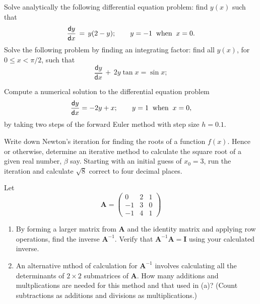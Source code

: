 \documentclass[12pt]{article}
\def\bA{\mathbf{A}}
\def\bI{\mathbf{I}}
\newcommand{\dif}{\mathsf{d}}
\begin{document}
\question
Solve analytically the following differential equation problem: find $y(x)$ such that
$$ \frac{\dif y}{\dif x}\,=\,  y (2-y)   ; \qquad y=-1\>\hbox{ when }\> x=0. $$
\question
Solve the following problem by finding an  integrating factor:  find all $y(x)$, for $0\le x < \pi/2$, such that
$$  \frac{\dif y}{\dif x}\,+\, 2y\tan x = \sin{x}   ;  $$
\noindent

\newpage
\question
Compute a numerical solution to the differential equation problem 
$$ \frac{\dif y}{\dif x} =  -2 y + x    ; \qquad y=1\>\hbox{ when }\> x=0, $$
by taking two steps of the forward Euler method with 
step size $h=0.1$.

\question
Write down  Newton's iteration   for finding the roots of
a function $f(x)$. Hence or otherwise, 
determine an iterative method to calculate the square root of a given real 
number, $\beta$ say. Starting with an initial guess of $x_0 =3$, run the
iteration and   calculate $\sqrt{8}$ correct to  four decimal places.



\question

Let
$$ \bA = \left( \begin{array}{rrr} 0 & 2& 1 \\ -1 &  3 & 0 \\ -1 & 4 & 1  \end{array} \right)$$  



\begin{enumerate}
\item 
By forming a larger matrix  from $\bA$ and the identity matrix and applying row operations, find the inverse $\bA^{-1}$.  Verify that $\bA^{-1}\bA= \bI$ using your calculated inverse.
 \null\vspace{-0.2cm} 
\item
An alternative mthod of calculation for $\bA^{-1}$ involves calculating all the determinants of $2 \times 2$ submatrices of $\bA$. How many additions and multplications are needed for this method and that used in (a)? (Count subtractions as additions and divisions as multiplications.)
 \null\vspace{-0.2cm} 

\end{enumerate}
\end{document}
